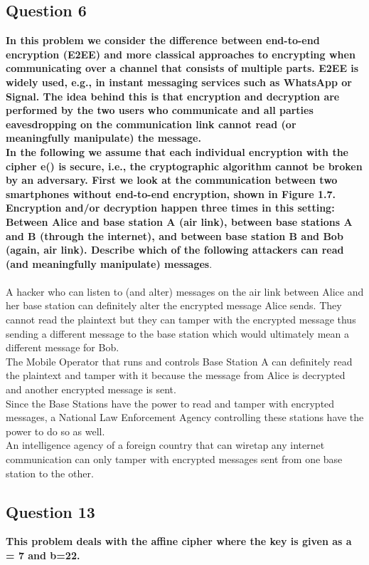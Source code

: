 \documentclass[titlepage]{article}
\begin{document}
{\subsection{Question 6}
{
\textbf{In this problem we consider the difference between end-to-end encryption (E2EE) and more classical approaches to encrypting when communicating over a channel that consists of multiple parts. E2EE is widely used, e.g., in instant messaging services such as WhatsApp or Signal. The idea behind this is that encryption and decryption are performed by the two users who communicate and all parties eavesdropping on the communication link cannot read (or meaningfully manipulate) the message.\\In the following we assume that each individual encryption with the cipher e() is secure, i.e., the cryptographic algorithm cannot be broken by an adversary. First we look at the communication between two smartphones without end-to-end encryption, shown in Figure 1.7. Encryption and/or decryption happen three times in this setting: Between Alice and base station A (air link), between base stations A and B (through the internet), and between base station B and Bob (again, air link). Describe which of the following attackers can read (and meaningfully manipulate) messages}.\\\\
A hacker who can listen to (and alter) messages on the air link between Alice and her base station can definitely alter the encrypted message Alice sends. They cannot read the plaintext but they can tamper with the encrypted message thus sending a different message to the base station which would ultimately mean a different message for Bob.\\The Mobile Operator that runs and controls Base Station A can definitely read the plaintext and tamper with it because the message from Alice is decrypted and another encrypted message is sent.\\Since the Base Stations have the power to read and tamper with encrypted messages, a National Law Enforcement Agency controlling these stations have the power to do so as well.\\An intelligence agency of a foreign country that can wiretap any internet communication can only tamper with encrypted messages sent from one base station to the other.
}
\subsection{Question 13}
{
\textbf{This problem deals with the affine cipher where the key is given as a = 7 and
b=22.}
}}
\end{document}
